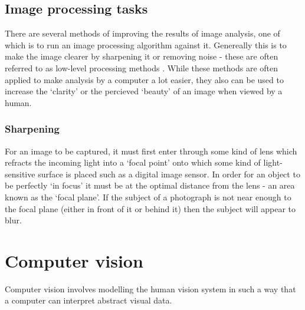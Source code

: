     \subsection{Image processing tasks}
      There are several methods of improving the results of image analysis, one of which is to run an image processing algorithm against it. Genereally this is to make the image clearer by sharpening it or removing noise - these are often referred to as low-level processing methods \citep{sonka2014image}. While these methods are often applied to make analysis by a computer a lot easier, they also can be used to increase the ‘clarity’ or the percieved ‘beauty’ of an image when viewed by a human.

      \subsubsection{Sharpening}
        For an image to be captured, it must first enter through some kind of lens which refracts the incoming light into a ‘focal point’ onto which some kind of light-sensitive surface is placed such as a digital image sensor. In order for an object to be perfectly ‘in focus’ it must be at the optimal distance from the lens - an area known as the ‘focal plane’. If the subject of a photograph is not near enough to the focal plane (either in front of it or behind it) then the subject will appear to blur.

  \section{Computer vision}
    Computer vision involves modelling the human vision system in such a way that a computer can interpret abstract visual data.


